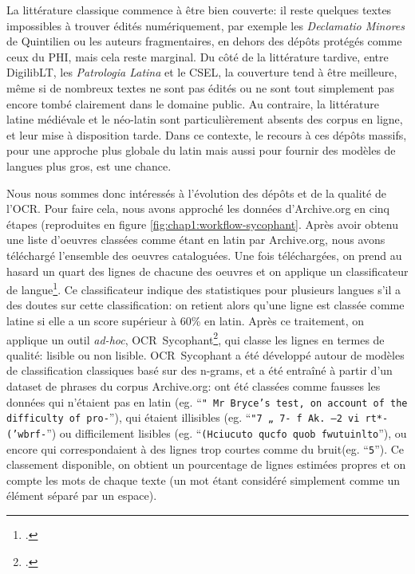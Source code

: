 La littérature classique commence à être bien couverte: il reste quelques textes impossibles à trouver édités numériquement, par exemple les \textit{Declamatio Minores} de Quintilien ou les auteurs fragmentaires, en dehors des dépôts protégés comme ceux du PHI, mais cela reste marginal. Du côté de la littérature tardive, entre DigilibLT, les \textit{Patrologia Latina} et le CSEL, la couverture tend à être meilleure, même si de nombreux textes ne sont pas édités ou ne sont tout simplement pas encore tombé clairement dans le domaine public. Au contraire, la littérature latine médiévale et le néo-latin sont particulièrement absents des corpus en ligne, et leur mise à disposition tarde. Dans ce contexte, le recours à ces dépôts massifs, pour une approche plus globale du latin mais aussi pour fournir des modèles de langues plus gros, est une chance.

Nous nous sommes donc intéressés à l'évolution des dépôts et de la qualité de l'OCR. Pour faire cela, nous avons approché les données d'Archive.org en cinq étapes (reproduites en figure \ref{fig:chap1:workflow-sycophant}. Après avoir obtenu une liste d'oeuvres classées comme étant en latin par Archive.org, nous avons téléchargé l'ensemble des oeuvres cataloguées. Une fois téléchargées, on prend au hasard un quart des lignes de chacune des oeuvres et on applique un classificateur de langue\footcite{salcianu2018compact}. Ce classificateur indique des statistiques pour plusieurs langues s'il a des doutes sur cette classification: on retient alors qu'une ligne est classée comme latine si elle a un score supérieur à 60\% en latin. Après ce traitement, on applique un outil \textit{ad-hoc}, OCR~Sycophant\footcite{Clerice_OCR_Sycophant_2021}, qui classe les lignes en termes de qualité: lisible ou non lisible. OCR~Sycophant a été développé autour de modèles de classification classiques basé sur des n-grams, et a été entraîné à partir d'un dataset de phrases du corpus Archive.org: ont été classées comme fausses les données qui n'étaient pas en latin (eg. ``\texttt{" Mr Bryce's test, on account of the difficulty of pro-}''), qui étaient illisibles (eg. ``\texttt{"7 „ 7- f Ak. —2 vi rt*- ('wbrf-}'') ou difficilement lisibles (eg. ``\texttt{(Hciucuto qucfo quob fwutuinlto}''), ou encore qui correspondaient à des lignes trop courtes comme du bruit(eg. ``\texttt{5}''). Ce classement disponible, on obtient un pourcentage de lignes estimées propres et on compte les mots de chaque texte (un mot étant considéré simplement comme un élément séparé par un espace).

